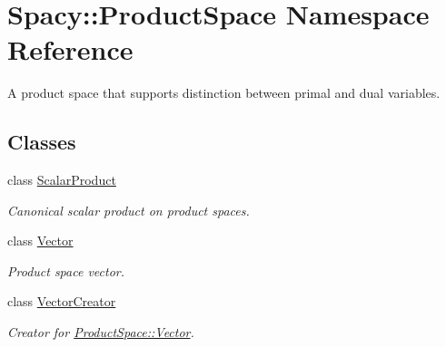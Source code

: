 \hypertarget{namespaceSpacy_1_1ProductSpace}{}\section{Spacy\+:\+:Product\+Space Namespace Reference}
\label{namespaceSpacy_1_1ProductSpace}


A product space that supports distinction between primal and dual variables.  


\subsection*{Classes}
\begin{DoxyCompactItemize}
\item 
class \hyperlink{classSpacy_1_1ProductSpace_1_1ScalarProduct}{Scalar\+Product}
\begin{DoxyCompactList}\small\item\em Canonical scalar product on product spaces. \end{DoxyCompactList}\item 
class \hyperlink{classSpacy_1_1ProductSpace_1_1Vector}{Vector}
\begin{DoxyCompactList}\small\item\em Product space vector. \end{DoxyCompactList}\item 
class \hyperlink{classSpacy_1_1ProductSpace_1_1VectorCreator}{Vector\+Creator}
\begin{DoxyCompactList}\small\item\em Creator for \hyperlink{classSpacy_1_1ProductSpace_1_1Vector}{Product\+Space\+::\+Vector}. \end{DoxyCompactList}\end{DoxyCompactItemize}

